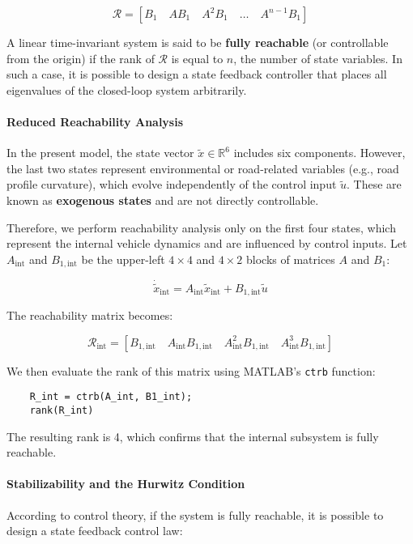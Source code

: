 \documentclass[]{report}
\begin{document}
\[
\mathcal{R} = \left[ B_1 \quad AB_1 \quad A^2B_1 \quad \dots \quad A^{n-1}B_1 \right]
\]

A linear time-invariant system is said to be \textbf{fully reachable} (or controllable from the origin) if the rank of $\mathcal{R}$ is equal to $n$, the number of state variables. In such a case, it is possible to design a state feedback controller that places all eigenvalues of the closed-loop system arbitrarily.

\paragraph{Reduced Reachability Analysis}

In the present model, the state vector $\tilde{x} \in \mathbb{R}^6$ includes six components. However, the last two states represent environmental or road-related variables (e.g., road profile curvature), which evolve independently of the control input $\tilde{u}$. These are known as \textbf{exogenous states} and are not directly controllable.

Therefore, we perform reachability analysis only on the first four states, which represent the internal vehicle dynamics and are influenced by control inputs. Let $A_{\text{int}}$ and $B_{1, \text{int}}$ be the upper-left $4 \times 4$ and $4 \times 2$ blocks of matrices $A$ and $B_1$:

\[
\dot{\tilde{x}}_{\text{int}} = A_{\text{int}} \tilde{x}_{\text{int}} + B_{1,\text{int}} \tilde{u}
\]

The reachability matrix becomes:

\[
\mathcal{R}_{\text{int}} = \left[ B_{1,\text{int}} \quad A_{\text{int}}B_{1,\text{int}} \quad A_{\text{int}}^2B_{1,\text{int}} \quad A_{\text{int}}^3B_{1,\text{int}} \right]
\]

We then evaluate the rank of this matrix using MATLAB's \texttt{ctrb} function:

\begin{verbatim}
	R_int = ctrb(A_int, B1_int);
	rank(R_int)
\end{verbatim}

The resulting rank is 4, which confirms that the internal subsystem is fully reachable.

\paragraph{Stabilizability and the Hurwitz Condition}

According to control theory, if the system is fully reachable, it is possible to design a state feedback control law:
\end{document}
